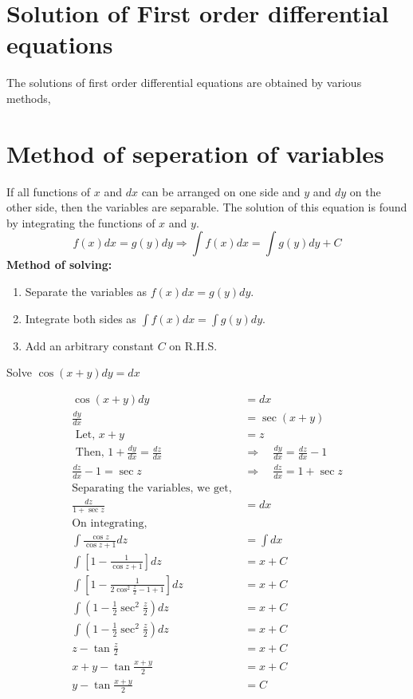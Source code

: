 \section{Solution of First order differential equations}
The solutions of first order differential equations are obtained by various methods,
\section{ Method of seperation of variables}
If all functions of $x$ and $d x$ can be arranged on one side and $y$ and $d y$ on the other side, then the variables are separable. The solution of this equation is found by integrating the functions of $x$ and $y$.
$$f(x) d x=g(y) d y\Longrightarrow
\int f(x) d x=\int g(y) d y+C
$$
\textbf{\large Method of solving:}
\begin{enumerate}
	\item  Separate the variables as $f(x) d x=g(y) dy$.
    \item Integrate both sides as $\int f(x) d x=\int g(y) d y$.
    \item  Add an arbitrary constant $C$ on R.H.S.
\end{enumerate}
\begin{exercise}
Solve	$\cos (x+y) d y=d x$
\end{exercise}
\begin{answer}[H]
	\begin{align*}
		\cos (x+y) d y&=d x \\
		\frac{d y}{d x}&=\sec (x+y)\\
		\text{  Let, }x+y&=z\\
		\text{  Then, }1+\frac{d y}{d x}=\frac{d z}{d x} \quad & \Rightarrow \quad \frac{d y}{d x}=\frac{d z}{d x}-1 \\
		\frac{d z}{d x}-1=\sec z \quad &\Rightarrow \quad  \frac{d z}{d x}=1+\sec z\\
		\text{Separating the variables, we get, }\\\frac{d z}{1+\sec z}&=d x\\
		\text{On integrating,}\\
		\int \frac{\cos z}{\cos z+1} d z&=\int d x\\
		\int\left[1-\frac{1}{\cos z+1}\right] d z&=x+C \\
		\int\left[ 1-\frac{1}{2 \cos ^{2} \frac{z}{2}-1+1}\right]  d z&=x+C \\
		\int\left(1-\frac{1}{2} \sec ^{2} \frac{z}{2}\right) d z&=x+C\\
		\int\left(1-\frac{1}{2} \sec ^{2} \frac{z}{2}\right) d z&=x+C\\
		z-\tan \frac{z}{2}&=x+C  \\
		x+y-\tan \frac{x+y}{2}&=x+C\\
		 y-\tan \frac{x+y}{2}&=C 
	\end{align*}
\end{answer}
